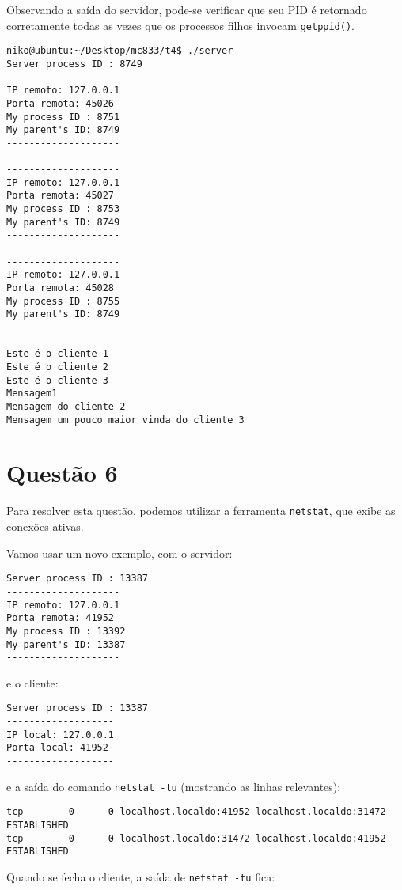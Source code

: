 \documentclass[a4paper,10pt]{article}
\begin{document}
Observando a saída do servidor, pode-se verificar que seu PID é retornado corretamente todas as vezes que os processos filhos invocam {\tt getppid()}.

\begin{lstlisting}
niko@ubuntu:~/Desktop/mc833/t4$ ./server 
Server process ID : 8749
--------------------
IP remoto: 127.0.0.1
Porta remota: 45026
My process ID : 8751
My parent's ID: 8749
--------------------

--------------------
IP remoto: 127.0.0.1
Porta remota: 45027
My process ID : 8753
My parent's ID: 8749
--------------------

--------------------
IP remoto: 127.0.0.1
Porta remota: 45028
My process ID : 8755
My parent's ID: 8749
--------------------

Este é o cliente 1
Este é o cliente 2
Este é o cliente 3
Mensagem1
Mensagem do cliente 2
Mensagem um pouco maior vinda do cliente 3

\end{lstlisting}

\section{Questão 6}

Para resolver esta questão, podemos utilizar a ferramenta {\tt netstat}, que exibe as conexões ativas.

Vamos usar um novo exemplo, com o servidor:

\begin{lstlisting}
Server process ID : 13387
--------------------
IP remoto: 127.0.0.1
Porta remota: 41952
My process ID : 13392
My parent's ID: 13387
--------------------
\end{lstlisting}

e o cliente:

\begin{lstlisting}
Server process ID : 13387
-------------------
IP local: 127.0.0.1
Porta local: 41952
-------------------
\end{lstlisting}

e a saída do comando {\tt netstat -tu} (mostrando as linhas relevantes):

\begin{lstlisting}
tcp        0      0 localhost.localdo:41952 localhost.localdo:31472 ESTABLISHED
tcp        0      0 localhost.localdo:31472 localhost.localdo:41952 ESTABLISHED
\end{lstlisting}

Quando se fecha o cliente, a saída de {\tt netstat -tu} fica:
\end{document}
